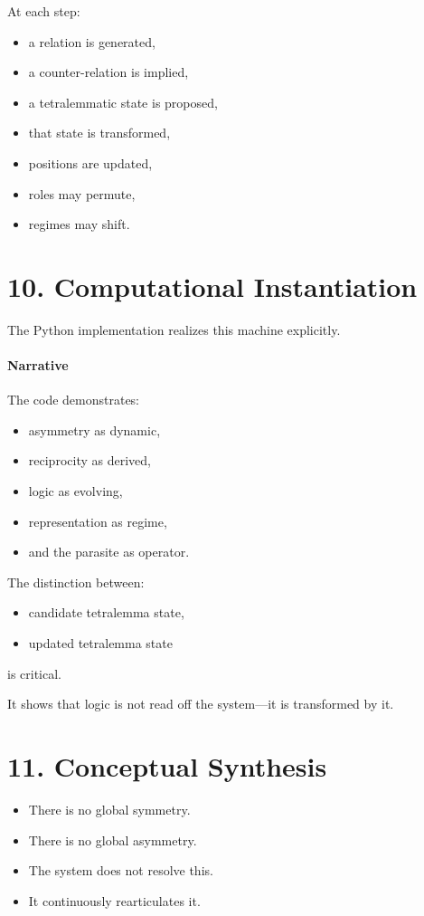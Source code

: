 \documentclass[11pt]{article}
\begin{document}
At each step:
\begin{itemize}
\item a relation is generated,
\item a counter-relation is implied,
\item a tetralemmatic state is proposed,
\item that state is transformed,
\item positions are updated,
\item roles may permute,
\item regimes may shift.
\end{itemize}

\section{10. Computational Instantiation}

The Python implementation realizes this machine explicitly.

\paragraph{Narrative}
The code demonstrates:
\begin{itemize}
\item asymmetry as dynamic,
\item reciprocity as derived,
\item logic as evolving,
\item representation as regime,
\item and the parasite as operator.
\end{itemize}

The distinction between:
\begin{itemize}
\item candidate tetralemma state,
\item updated tetralemma state
\end{itemize}
is critical.

It shows that logic is not read off the system---it is transformed by it.

\section{11. Conceptual Synthesis}

\begin{itemize}
\item There is no global symmetry.
\item There is no global asymmetry.
\item The system does not resolve this.
\item It continuously rearticulates it.
\end{itemize}
\end{document}
